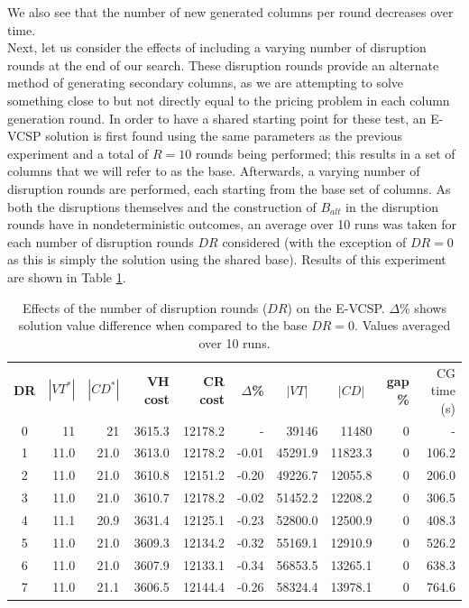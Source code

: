 \documentclass[]{article}
\begin{document}
We also see that the number of new generated columns per round decreases over time.  \\

\noindent Next, let us consider the effects of including a varying number of disruption rounds at the end of our search. These disruption rounds provide an alternate method of generating secondary columns, as we are attempting to solve something close to but not directly equal to the pricing problem in each column generation round. In order to have a shared starting point for these test, an E-VCSP solution is first found using the same parameters as the previous experiment and a total of $R=10$ rounds being performed; this results in a set of columns that we will refer to as the base. Afterwards, a varying number of disruption rounds are performed, each starting from the base set of columns. As both the disruptions themselves and the construction of $B_{alt}$ in the disruption rounds have in nondeterministic outcomes, an average over 10 runs was taken for each number of disruption rounds $DR$ considered (with the exception of $DR=0$ as this is simply the solution using the shared base). Results of this experiment are shown in Table \ref{tab:evcsp-disruptions}.
\begin{table}[h]
  \centering
  \begin{tabular}{crrrrrrrrr}
    \toprule
       \textbf{DR} & $|VT^*|$ & $|CD^*|$ & \textbf{VH cost} & \textbf{CR cost} & \textbf{$\Delta$\%} & \multicolumn{1}{c}{$|VT|$} & \multicolumn{1}{c}{$|CD|$} & \textbf{gap \%} & CG time (s) \\
       \cmidrule(lr){1-1} \cmidrule(lr){2-6} \cmidrule(lr){7-8} \cmidrule(lr){9-10}
        0   & 11   & 21   & 3615.3 & 12178.2 & -    & 39146   & 11480 & 0 & -    \\
        1   & 11.0 & 21.0 & 3613.0 & 12178.2 & -0.01 & 45291.9 & 11823.3 & 0 & 106.2  \\
        2   & 11.0 & 21.0 & 3610.8 & 12151.2 & -0.20 & 49226.7 & 12055.8 & 0 & 206.0  \\
        3   & 11.0 & 21.0 & 3610.7 & 12178.2 & -0.02 & 51452.2 & 12208.2 & 0 & 306.5  \\
        4   & 11.1 & 20.9 & 3631.4 & 12125.1 & -0.23 & 52800.0 & 12500.9 & 0 & 408.3  \\
        5   & 11.0 & 21.0 & 3609.3 & 12134.2 & -0.32 & 55169.1 & 12910.9 & 0 & 526.2  \\
        6   & 11.0 & 21.0 & 3607.9 & 12133.1 & -0.34 & 56853.5 & 13265.1 & 0 & 638.3  \\
        7   & 11.0 & 21.1 & 3606.5 & 12144.4 & -0.26 & 58324.4 & 13978.1 & 0 & 764.6  \\
        \bottomrule
  \end{tabular}
  \caption{Effects of the number of disruption rounds ($DR$) on the E-VCSP. $\Delta$\% shows solution value difference when compared to the base $DR=0$. Values averaged over 10 runs. }
  \label{tab:evcsp-disruptions}
\end{table}
\end{document}
